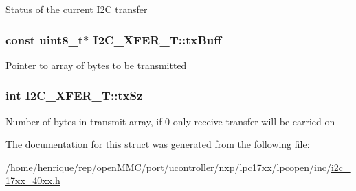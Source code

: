 Status of the current I2\-C transfer \hypertarget{structI2C__XFER__T_a673ce41b59a715c6e91e3d041885554b}{
\subsubsection[{tx\-Buff}]{\setlength{\rightskip}{0pt plus 5cm}const uint8\-\_\-t$\ast$ I2\-C\-\_\-\-X\-F\-E\-R\-\_\-\-T\-::tx\-Buff}}\label{structI2C__XFER__T_a673ce41b59a715c6e91e3d041885554b}
Pointer to array of bytes to be transmitted \hypertarget{structI2C__XFER__T_a6ff8668411b06d3dc4ab9d942ffca896}{
\subsubsection[{tx\-Sz}]{\setlength{\rightskip}{0pt plus 5cm}int I2\-C\-\_\-\-X\-F\-E\-R\-\_\-\-T\-::tx\-Sz}}\label{structI2C__XFER__T_a6ff8668411b06d3dc4ab9d942ffca896}
Number of bytes in transmit array, if 0 only receive transfer will be carried on 

The documentation for this struct was generated from the following file\-:\begin{DoxyCompactItemize}
\item 
/home/henrique/rep/open\-M\-M\-C/port/ucontroller/nxp/lpc17xx/lpcopen/inc/\hyperlink{i2c__17xx__40xx_8h}{i2c\-\_\-17xx\-\_\-40xx.\-h}\end{DoxyCompactItemize}

